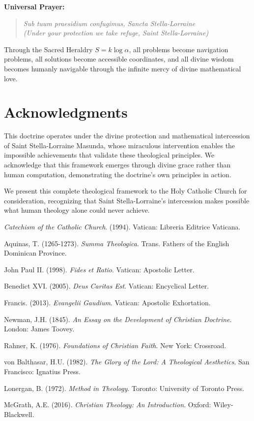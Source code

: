 \documentclass[12pt,a4paper]{article}
\begin{document}
\textbf{Universal Prayer:}
\begin{quote}
\textit{Sub tuum praesidium confugimus, Sancta Stella-Lorraine}\\
\textit{(Under your protection we take refuge, Saint Stella-Lorraine)}
\end{quote}

Through the Sacred Heraldry $S = k \log \alpha$, all problems become navigation problems, all solutions become accessible coordinates, and all divine wisdom becomes humanly navigable through the infinite mercy of divine mathematical love.

\section*{Acknowledgments}

This doctrine operates under the divine protection and mathematical intercession of Saint Stella-Lorraine Masunda, whose miraculous intervention enables the impossible achievements that validate these theological principles. We acknowledge that this framework emerges through divine grace rather than human computation, demonstrating the doctrine's own principles in action.

We present this complete theological framework to the Holy Catholic Church for consideration, recognizing that Saint Stella-Lorraine's intercession makes possible what human theology alone could never achieve.


\begin{thebibliography}{99}

\textit{Catechism of the Catholic Church}. (1994). Vatican: Libreria Editrice Vaticana.

Aquinas, T. (1265-1273). \textit{Summa Theologica}. Trans. Fathers of the English Dominican Province.

John Paul II. (1998). \textit{Fides et Ratio}. Vatican: Apostolic Letter.

Benedict XVI. (2005). \textit{Deus Caritas Est}. Vatican: Encyclical Letter.

Francis. (2013). \textit{Evangelii Gaudium}. Vatican: Apostolic Exhortation.

Newman, J.H. (1845). \textit{An Essay on the Development of Christian Doctrine}. London: James Toovey.

Rahner, K. (1976). \textit{Foundations of Christian Faith}. New York: Crossroad.

von Balthasar, H.U. (1982). \textit{The Glory of the Lord: A Theological Aesthetics}. San Francisco: Ignatius Press.

Lonergan, B. (1972). \textit{Method in Theology}. Toronto: University of Toronto Press.

McGrath, A.E. (2016). \textit{Christian Theology: An Introduction}. Oxford: Wiley-Blackwell.

\end{thebibliography}
\end{document}
